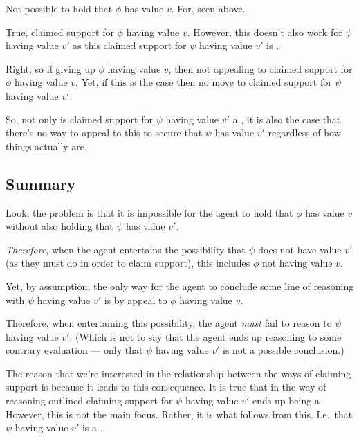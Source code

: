 \begin{note}
  Not possible to hold that \(\phi\) has value \(v\).
  For, seen above.
\end{note}

\begin{note}
  True, claimed support for \(\phi\) having value \(v\).
  However, this doesn't also work for \(\psi\) having value \(v'\) as this claimed support for \(\psi\) having value \(v'\) is \requ{}.

  Right, so if giving up \(\phi\) having value \(v\), then not appealing to claimed support for \(\phi\) having value \(v\).
  Yet, if this is the case then no move to claimed support for \(\psi\) having value \(v'\).

  So, not only is claimed support for \(\psi\) having value \(v'\) a \requ{}, it is also the case that there's no way to appeal to this to secure that \(\psi\) has value \(v'\) regardless of how things actually are.
\end{note}

\subsection{Summary}

\begin{note}[To summarise]
  Look, the problem is that it is impossible for the agent to hold that \(\phi\) has value \(v\) without also holding that \(\psi\) has value \(v'\).

  \emph{Therefore}, when the agent entertains the possibility that \(\psi\) does not have value \(v'\) (as they must do in order to claim support), this includes \(\phi\) not having value \(v\).

  Yet, by assumption, the only way for the agent to conclude some line of reasoning with \(\psi\) having value \(v'\) is by appeal to \(\phi\) having value \(v\).

  Therefore, when entertaining this possibility, the agent \emph{must} fail to reason to \(\psi\) having value \(v'\).
  (Which is not to say that the agent ends up reasoning to some contrary evaluation --- only that \(\psi\) having value \(v'\) is not a possible conclusion.)

  The reason that we're interested in the relationship between the ways of claiming support is because it leads to this consequence.
  It is true that in the way of reasoning outlined claiming support for \(\psi\) having value \(v'\) ends up being a \requ{}.
  However, this is not the main focus.
  Rather, it is what follows from this.
  I.e.\ that \(\psi\) having value \(v'\) is a \requ{}.
\end{note}

